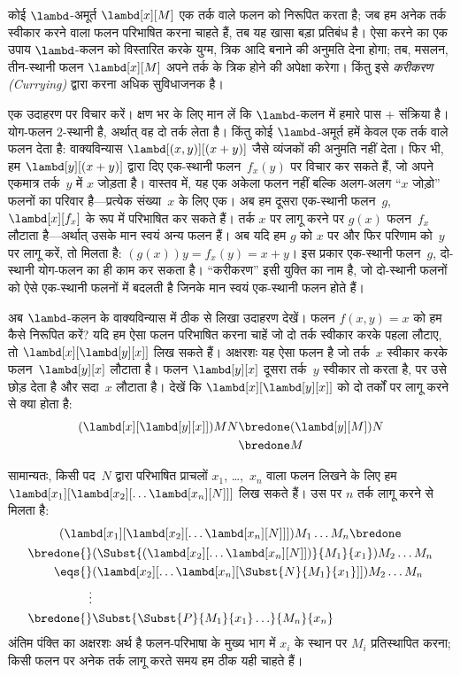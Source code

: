 \documentclass[../../../include/open-logic-section]{subfiles}
\begin{document}

कोई $\lambd$-अमूर्त $\lambd[x][M]$ एक तर्क वाले फलन को निरूपित करता है;
जब हम अनेक तर्क स्वीकार करने वाला फलन परिभाषित करना चाहते हैं, तब यह खासा
बड़ा प्रतिबंध है। ऐसा करने का एक उपाय $\lambd$-कलन को विस्तारित करके युग्म,
त्रिक आदि बनाने की अनुमति देना होगा; तब, मसलन, तीन-स्थानी फलन
$\lambd[x][M]$ अपने तर्क के त्रिक होने की अपेक्षा करेगा। किंतु इसे
\emph{करीकरण (Currying)} द्वारा करना अधिक सुविधाजनक है।

एक उदाहरण पर विचार करें। क्षण भर के लिए मान लें कि $\lambd$-कलन में हमारे
पास $+$ संक्रिया है। योग-फलन $2$-स्थानी है, अर्थात् वह दो तर्क लेता है।
किंतु कोई $\lambd$-अमूर्त हमें केवल एक तर्क वाले फलन देता है: वाक्यविन्यास
$\lambd[(x,y)][(x+y)]$ जैसे व्यंजकों की अनुमति नहीं देता। फिर भी, हम
$\lambd[y][(x+y)]$ द्वारा दिए एक-स्थानी फलन~$f_x(y)$ पर विचार कर सकते हैं,
जो अपने एकमात्र तर्क~$y$ में $x$ जोड़ता है। वास्तव में, यह एक अकेला फलन
नहीं बल्कि अलग-अलग ``$x$ जोड़ो'' फलनों का परिवार है---प्रत्येक संख्या~$x$
के लिए एक। अब हम दूसरा एक-स्थानी फलन~$g$, ~$\lambd[x][f_x]$ के रूप में
परिभाषित कर सकते हैं। तर्क $x$ पर लागू करने पर $g(x)$ फलन~$f_x$ लौटाता
है---अर्थात् उसके मान स्वयं अन्य फलन हैं। अब यदि हम $g$ को $x$ पर और फिर
परिणाम को~$y$ पर लागू करें, तो मिलता है: $(g(x))y = f_x(y) = x+y$। इस
प्रकार एक-स्थानी फलन~$g$, दो-स्थानी योग-फलन का ही काम कर सकता है।
``करीकरण'' इसी युक्ति का नाम है, जो दो-स्थानी फलनों को ऐसे एक-स्थानी फलनों
में बदलती है जिनके मान स्वयं एक-स्थानी फलन होते हैं।

अब $\lambd$-कलन के वाक्यविन्यास में ठीक से लिखा उदाहरण देखें। फलन
$f(x,y) = x$ को हम कैसे निरूपित करें? यदि हम ऐसा फलन परिभाषित करना चाहें
जो दो तर्क स्वीकार करके पहला लौटाए, तो $\lambd[x][\lambd[y][x]]$ लिख सकते
हैं। अक्षरशः यह ऐसा फलन है जो तर्क~$x$ स्वीकार करके फलन~$\lambd[y][x]$
लौटाता है। फलन $\lambd[y][x]$ दूसरा तर्क~$y$ स्वीकार तो करता है, पर उसे
छोड़ देता है और सदा~$x$ लौटाता है। देखें कि
$\lambd[x][\lambd[y][x]]$ को दो तर्कों पर लागू करने से क्या होता है:
\begin{align*}
  (\lambd[x][\lambd[y][x]])MN 
  \bredone & (\lambd[y][M])N \\
  \bredone & M
\end{align*}

सामान्यतः, किसी पद~$N$ द्वारा परिभाषित प्राचलों $x_1$, \dots,~$x_n$ वाला
फलन लिखने के लिए हम $\lambd[x_1][\lambd[x_2][\ldots\lambd[x_n][N]]]$
लिख सकते हैं। उस पर $n$ तर्क लागू करने से मिलता है:
\begin{multline*}
  (\lambd[x_1][\lambd[x_2][\ldots\lambd[x_n][N]]]) M_1 \dots M_n \bredone\\
  \begin{aligned}
  \bredone {} & (\Subst{(\lambd[x_2][\ldots\lambd[x_n][N]])}{M_1}{x_1}) M_2
  \dots M_n\\
   \eqs {} & (\lambd[x_2][\ldots\lambd[x_n][\Subst{N}{M_1}{x_1}]]) M_2
            \dots M_n \\
  \vdots & \\
  \bredone {} &\Subst{\Subst{P}{M_1}{x_1}\ldots}{M_n}{x_n}
  \end{aligned}
\end{multline*}
अंतिम पंक्ति का अक्षरशः अर्थ है फलन-परिभाषा के मुख्य भाग में $x_i$ के
स्थान पर $M_i$ प्रतिस्थापित करना; किसी फलन पर अनेक तर्क लागू करते समय हम
ठीक यही चाहते हैं।
\end{document}

